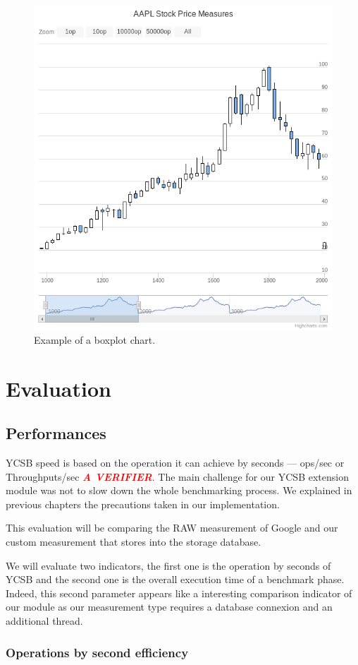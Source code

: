 \documentclass[a4paper,11pt]{report}
\newcommand*{\tocheck}{\textcolor{red}{\bf \emph{A VERIFIER}}}
\begin{document}
\begin{figure}[ht]
\begin{center}
\includegraphics[width=0.60\linewidth]{images/boxplot.png}
\caption{Example of a boxplot chart.}
\label{boxplot}
\end{center}
\end{figure}

\chapter{Evaluation}

\section{Performances}

YCSB speed is based on the operation it can achieve by seconds --- ops/sec or Throughputs/sec \tocheck. The main challenge for our YCSB extension module was not to slow down the whole benchmarking process. We explained in previous chapters the precautions taken in our implementation.

This evaluation will be comparing the RAW measurement of Google and our custom measurement that stores into the storage database.

We will evaluate two indicators, the first one is the operation by seconds of YCSB and the second one is the overall execution time of a benchmark phase. Indeed, this second parameter appears like a interesting comparison indicator of our module as our measurement type requires a database connexion and an additional thread.

\subsection{Operations by second efficiency}
\end{document}
